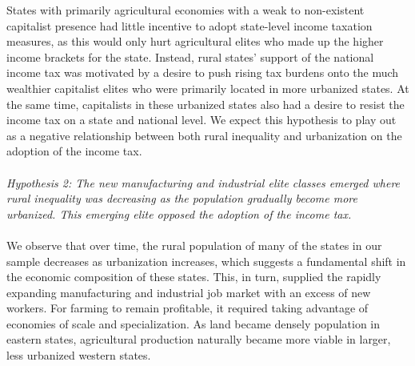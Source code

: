 \documentclass[letter, 12pt]{article}
\begin{document}
States with primarily agricultural economies with a weak to non-existent capitalist presence had little incentive to adopt state-level income taxation measures, as this would only hurt agricultural elites who made up the higher income brackets for the state. Instead, rural states' support of the national income tax was motivated by a desire to push rising tax burdens onto the much wealthier capitalist elites who were primarily located in more urbanized states. At the same time, capitalists in these urbanized states also had a desire to resist the income tax on a state and national level. We expect this hypothesis to play out as a negative relationship between both rural inequality and urbanization on the adoption of the income tax.
\\
\\
\emph{Hypothesis 2: The new manufacturing and industrial elite classes emerged where rural inequality was decreasing as the population gradually become more urbanized. This emerging elite opposed the adoption of the income tax.}
\\
\\
We observe that over time, the rural population of many of the states in our sample decreases as urbanization increases, which suggests a fundamental shift in the economic composition of these states. This, in turn, supplied the rapidly expanding manufacturing and industrial job market with an excess of new workers. For farming to remain profitable, it required taking advantage of economies of scale and specialization. As land became densely population in eastern states, agricultural production naturally became more viable in larger, less urbanized western states. 
\end{document}
